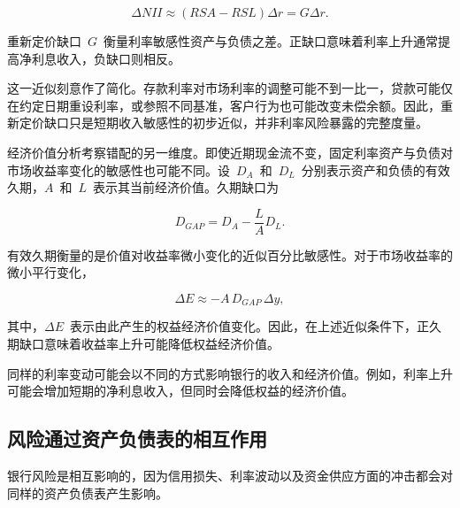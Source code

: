 \begin{equation}
\Delta \textit{NII}\approx (\textit{RSA}-\textit{RSL})\Delta r
=G\Delta r.
\label{eq:ch12-net-interest-income-gap}
\end{equation}

重新定价缺口~$G$~衡量利率敏感性资产与负债之差。正缺口意味着利率上升通常提高净利息收入，负缺口则相反。

这一近似刻意作了简化。存款利率对市场利率的调整可能不到一比一，贷款可能仅在约定日期重设利率，或参照不同基准，客户行为也可能改变未偿余额。因此，重新定价缺口只是短期收入敏感性的初步近似，并非利率风险暴露的完整度量。

经济价值分析考察错配的另一维度。即使近期现金流不变，固定利率资产与负债对市场收益率变化的敏感性也可能不同。设~$D_A$~和~$D_L$~分别表示资产和负债的有效久期，$A$~和~$L$~表示其当前经济价值。久期缺口为

\begin{equation}
D_{GAP}=D_A-\frac{L}{A}D_L.
\label{eq:ch12-duration-gap}
\end{equation}

有效久期衡量的是价值对收益率微小变化的近似百分比敏感性。对于市场收益率的微小平行变化，

\begin{equation}
\Delta E\approx -A\,D_{GAP}\,\Delta y,
\label{eq:ch12-duration-gap-equity}
\end{equation}

其中，$\Delta E$~表示由此产生的权益经济价值变化。因此，在上述近似条件下，正久期缺口意味着收益率上升可能降低权益经济价值。

\begin{tcolorbox}[
  enhanced,
  breakable,
  colback=white,
  colframe=FinanceBlue,
  boxrule=0.7pt,
  sharp corners,
  borderline west={2.2pt}{0pt}{FinanceBlue},
  title=\textbf{财务展望：收入效应与经济价值效应可能存在差异},
  coltitle=white,
  colbacktitle=FinanceBlue,
  fonttitle=\bfseries,
  before skip=1.2em,
  after skip=1.2em
]

同样的利率变动可能会以不同的方式影响银行的收入和经济价值。例如，利率上升可能会增加短期的净利息收入，但同时会降低权益的经济价值。

\end{tcolorbox}

\subsection{风险通过资产负债表的相互作用}

银行风险是相互影响的，因为信用损失、利率波动以及资金供应方面的冲击都会对同样的资产负债表产生影响。

